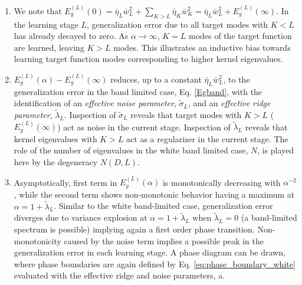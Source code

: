 \documentclass[11pt]{article}
\begin{document}
\begin{enumerate}[noitemsep,topsep=0pt,leftmargin=*]
\item We note that $E_g^{(L)}(0) = \bar\eta_L\bar w_{L}^2 + \sum_{K> L}\bar\eta_{K}\bar w_{K}^2 = \bar\eta_L\bar w_{L}^2+E^{(L)}_g(\infty)$.
In the learning stage $L$, generalization error due to all target modes with $K<L$ has already decayed to zero. As $\alpha \to \infty$, $K=L$ modes of the target function are learned, leaving $K>L$ modes. This illustrates an inductive bias towards learning target function modes corresponding to higher kernel eigenvalues.
\item  $E_g^{(L)}(\alpha)-E^{(L)}_g(\infty)$ reduces, up to a constant $\bar\eta_{L}\bar w_{L}^2$, to the generalization error in the band limited case,  Eq. \eqref{Egband}, with the identification of an \textit{effective noise parameter},  $\tilde \sigma_L$, and an \textit{effective ridge parameter}, $\tilde\lambda_{L}$. Inspection of $\tilde \sigma_L$ reveals that target modes with $K>L$ ($E^{(L)}_g(\infty)$) act as noise in the current stage. Inspection of $\tilde\lambda_{L}$ reveals that kernel eigenvalues with $K>L$ act as a regularizer in the current stage. The role of the number of eigenvalues in the white band limited case, $N$, is played here by the degeneracy $N(D,L)$.
\item Asymptotically, first term in $E_g^{(L)}(\alpha)$ is monotonically decreasing with $\alpha^{-2}$, while the second term shows non-monotonic behavior having a maximum at $\alpha = 1+\tilde\lambda_{L}$. Similar to the white band-limited case, generalization error diverges due to variance explosion at $\alpha = 1+\tilde\lambda_{L}$ when $\tilde\lambda_{L} = 0$ (a band-limited spectrum is possible) implying again a first order phase transition.  Non-monotonicity caused by the noise term implies a possible peak in the generalization error in each learning stage. A phase diagram can be drawn, where phase boundaries are again defined by Eq. \eqref{eq:phase_boundary_white} evaluated with the effective ridge and noise parameters, a.


\end{enumerate}
\end{document}
